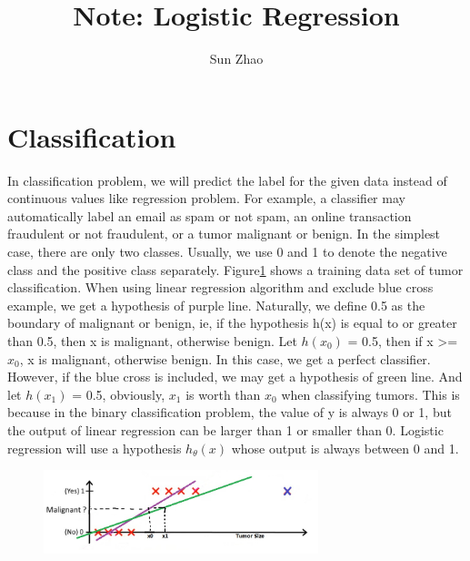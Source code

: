 \documentclass{article}
\title{Note: Logistic Regression}
\author{Sun Zhao}
\begin{document}
\maketitle
\newpage

\section{Classification}
In classification problem, we will predict the label for the given data instead of continuous values like regression problem. For example, a classifier may automatically label an email as spam or not spam, an online transaction fraudulent or not fraudulent, or a tumor malignant or benign. In the simplest case, there are only two classes. Usually, we use 0 and 1 to denote the negative class and the positive class separately. Figure\ref{classification_example} shows a training data set of tumor classification. When using linear regression algorithm and exclude blue cross example, we get a hypothesis of purple line. Naturally, we define 0.5 as the boundary of malignant or benign, ie, if the hypothesis h(x) is equal to or greater than 0.5, then x is malignant, otherwise benign. Let $h(x_{0})$ = 0.5, then if x >= $x_{0}$, x is malignant, otherwise benign. In this case, we get a perfect classifier. However, if the blue cross is included, we may get a hypothesis of green line. And let $h(x_{1})$ = 0.5, obviously, $x_{1}$ is worth than $x_{0}$ when classifying tumors. This is because in the binary classification problem, the value of y is always 0 or 1, but the output of linear regression can be larger than 1 or smaller than 0. Logistic regression will use a hypothesis $h_{\theta}(x)$ whose output is always between 0 and 1.

\begin{figure}[ht]
  \centering
  \includegraphics[width=8cm]{Figure1.jpg}\\
  \caption{}\label{classification_example}
\end{figure}
\end{document}
